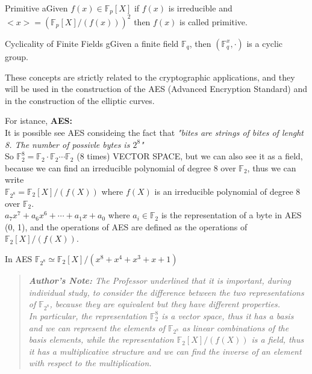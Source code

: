\begin{defBox}{Primitive}
    aGiven $f(x) \in \mathbb{F}_p[X]$ if $f(x)$ is irreducible and \\
    $<x> = (\mathbb{F}_p[X]/(f(x)))^2$ then $f(x)$ is called primitive.
\end{defBox}
\bigskip

\begin{thmBox}{Cyclicality of Finite Fields}
    gGiven a finite field $\mathbb{F}_q$, then $(\mathbb{F}_q^x, \cdot)$ is a cyclic group.
\end{thmBox}

\noindent
These concepts are strictly related to the cryptographic applications, and they will be used in the construction of the AES (Advanced Encryption Standard) and in the construction of the elliptic curves.
\medskip

\noindent
For istance, \textbf{AES:}
\\
It is possible see AES consideing the fact that \textit{"bites are strings of bites of lenght 8. The number of possivle bytes is $2^8$"}\\
So $\mathbb{F}_2^8 = \mathbb{F}_2 \cdot \mathbb{F}_2 \cdots \mathbb{F}_2$ (8 times) VECTOR SPACE, but we can also see it as a field, because we can find an irreducible polynomial of degree 8 over $\mathbb{F}_2$, thus we can write\\
$\mathbb{F}_{2^8} = \mathbb{F}_2 [X] / (f(X))$ where $f(X)$ is an irreducible polynomial of degree 8 over $\mathbb{F}_2$.\\
$a_7x^7 + a_6x^6 + \cdots + a_1x + a_0$ where $a_i \in \mathbb{F}_2$ is the representation of a byte in AES (0, 1), and the operations of AES are defined as the operations of $\mathbb{F}_2[X] / (f(X))$.\\
\medskip

\noindent
In AES $\mathbb{F}_{2^8} \simeq \mathbb{F}_2[X] / (x^8 + x^4 + x^3 + x + 1)$ 


\begin{quote}
\textit{\textbf{Author's Note:} The Professor underlined that it is important, during individual study, to consider the difference between the two representations of $\mathbb{F}_{2^8}$, because they are equivalent but they have different properties.\\
In particular, the representation $\mathbb{F}_2^8$ is a vector space, thus it has a basis and we can represent the elements of $\mathbb{F}_{2^8}$ as linear combinations of the basis elements, while the representation $\mathbb{F}_2[X] / (f(X))$ is a field, thus it has a multiplicative structure and we can find the inverse of an element with respect to the multiplication.}
\end{quote}

